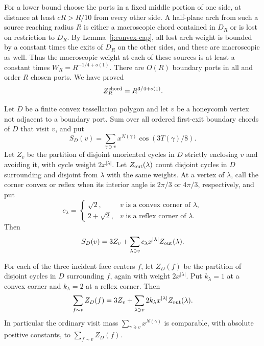 For a lower bound choose the ports in a fixed middle portion of one
side, at distance at least $cR>R/10$ from every other side. A half-plane
arch from such a source reaching radius $R$ is either a macroscopic
chord contained in $D_R$ or is lost on restriction to $D_R$. By
Lemma~\ref{j:convex-cap}, all lost arch weight is bounded by a constant
times the exits of $D_R$ on the other sides, and these are macroscopic
as well. Thus the macroscopic weight at each of these sources is at
least a constant times $W_R=R^{-1/4+o(1)}$. There are $O(R)$ boundary
ports in all and order $R$ chosen ports. We have proved
\begin{equation}\label{j:chord-partition}
 Z_R^{\rm chord}=R^{3/4+o(1)}.
\end{equation}

\begin{proposition}\label{j:visit}
Let $D$ be a finite convex tessellation polygon and let $v$ be a
honeycomb vertex not adjacent to a boundary port. Sum over all ordered
first-exit boundary chords of $D$ that visit $v$, and put
\[
 S_D(v)=\sum_{\gamma\ni v}x^{N(\gamma)}\cos(3T(\gamma)/8).
\]
Let $Z_v$ be the partition of disjoint unoriented cycles in $D$
strictly enclosing $v$ and avoiding it, with cycle weight
$2x^{|\lambda|}$. Let $Z_{\rm out}(\lambda)$ count disjoint cycles in
$D$ surrounding and disjoint from $\lambda$ with the same weights. At a
vertex of $\lambda$, call the corner convex or reflex when its interior
angle is $2\pi/3$ or $4\pi/3$, respectively, and put
\[
 c_\lambda=
 \begin{cases}
 \sqrt2,&v\text{ is a convex corner of }\lambda,\\
 2+\sqrt2,&v\text{ is a reflex corner of }\lambda.
 \end{cases}
\]
Then
\begin{equation}\label{j:visit-identity}
 S_D(v)=3Z_v+\sum_{\lambda\ni v}c_\lambda
       x^{|\lambda|}Z_{\rm out}(\lambda).
\end{equation}

For each of the three incident face centers $f$, let $Z_D(f)$ be the
partition of disjoint cycles in $D$ surrounding $f$, again with weight
$2x^{|\lambda|}$. Put $k_\lambda=1$ at a convex corner and
$k_\lambda=2$ at a reflex corner. Then
\begin{equation}\label{j:incident-face-partition}
 \sum_{f\sim v}Z_D(f)
 =3Z_v+\sum_{\lambda\ni v}2k_\lambda x^{|\lambda|}
                         Z_{\rm out}(\lambda).
\end{equation}
In particular the ordinary visit mass
$\sum_{\gamma\ni v}x^{N(\gamma)}$ is comparable, with absolute positive
constants, to $\sum_{f\sim v}Z_D(f)$.
\end{proposition}

